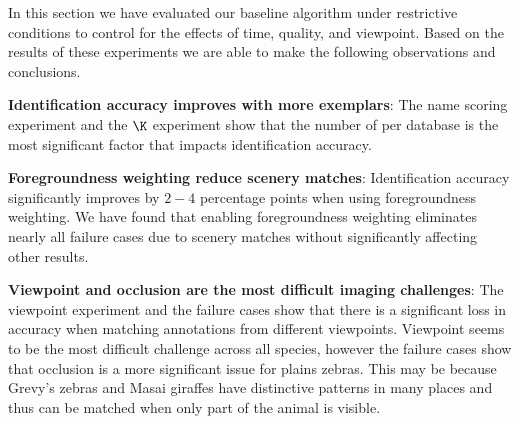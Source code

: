         In this section we have evaluated our baseline algorithm under
          restrictive conditions to control for the effects of time,
          quality, and viewpoint.
        Based on the results of these experiments we are able to make
          the following observations and conclusions.
        \begin{itemln}

            \item \textbf{Identification accuracy improves with more exemplars}:
            The name scoring experiment and the $\K$ experiment show
              that the number of \exemplars{} per database \name{} is the
              most significant factor that impacts identification
              accuracy.

            \item \textbf{Foregroundness weighting reduce scenery matches}:
            Identification accuracy significantly improves by $2-4$
              percentage points when using foregroundness weighting.
            We have found that enabling foregroundness weighting
              eliminates nearly all failure cases due to scenery matches
              without significantly affecting other results.

            \item \textbf{Viewpoint and occlusion are the most difficult imaging challenges}:
            The viewpoint experiment and the failure cases show that
              there is a significant loss in accuracy when matching
              annotations from different viewpoints.
            Viewpoint seems to be the most difficult challenge across
              all species, however the failure cases show that occlusion
              is a more significant issue for plains zebras.
            This may be because Grevy's zebras and Masai giraffes have
              distinctive patterns in many places and thus can be matched
              when only part of the animal is visible.


\end{itemln}
